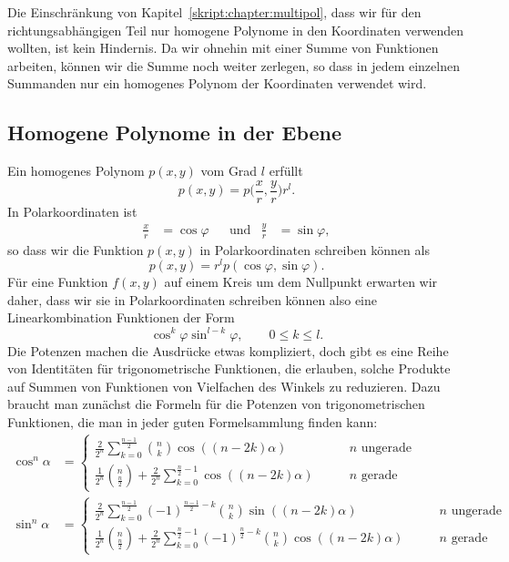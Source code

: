 
Die Einschränkung von Kapitel~\ref{skript:chapter:multipol}, dass wir
für den richtungsabhängigen Teil nur homogene Poly\-nome in den Koordinaten
verwenden wollten, ist kein Hindernis.
Da wir ohnehin mit einer Summe von Funktionen arbeiten, können wir
die Summe noch weiter zerlegen, so dass in jedem einzelnen Summanden nur ein
homogenes Polynom der Koordinaten verwendet wird.

\subsection{Homogene Polynome in der Ebene}
Ein homogenes Polynom $p(x,y)$ vom Grad $l$ erfüllt
\[
p(x,y) = p\biggl(\frac{x}{r},\frac{y}{r}\biggr) r^l.
\]
In Polarkoordinaten ist
\[
\begin{aligned}
\frac{x}{r}&=\cos\varphi
&&\text{und}&
\frac{y}{r}&=\sin\varphi,
\end{aligned}
\]
so dass wir die Funktion $p(x,y)$ in Polarkoordinaten schreiben
können als
\[
p(x,y)=r^l p(\cos\varphi,\sin\varphi).
\]
Für eine Funktion $f(x,y)$ auf einem Kreis um dem Nullpunkt erwarten wir
daher, dass wir sie in Polarkoordinaten schreiben können also eine
Linearkombination Funktionen der Form
\begin{equation}
\cos^k\varphi \sin^{l-k}\varphi,\qquad 0\le k\le l.
\label{skript:kugelfunktionen:produkte}
\end{equation}
Die Potenzen machen die Ausdrücke etwas kompliziert, doch gibt
es eine Reihe von Identitäten für trigonometrische Funktionen,
die erlauben, solche Produkte auf Summen von Funktionen von 
Vielfachen des Winkels zu reduzieren.
Dazu braucht man zunächst die Formeln für die Potenzen von trigonometrischen
Funktionen, die man in jeder guten Formelsammlung finden kann:
\begin{align*}
\cos^n\alpha
&=
\begin{cases}
\displaystyle
\frac{2}{2^n}\sum_{k=0}^{\frac{n-1}2} \binom{n}{k}\cos((n-2k)\alpha)
&\qquad\text{$n$ ungerade}
\\[10pt]
\displaystyle
\frac{1}{2^n}\binom{n}{\frac{n}2}
+
\frac{2}{2^n}\sum_{k=0}^{\frac{n}2-1}\cos((n-2k)\alpha)
&\qquad\text{$n$ gerade}
\end{cases}
\\
\sin^n\alpha
&=
\begin{cases}
\displaystyle
\frac{2}{2^n}\sum_{k=0}^{\frac{n-1}2} (-1)^{\frac{n-1}2-k}\binom{n}{k}\sin((n-2k)\alpha)
&\qquad\text{$n$ ungerade}
\\[10pt]
\displaystyle
\frac{1}{2^n}\binom{n}{\frac{n}2}
+
\frac{2}{2^n}\sum_{k=0}^{\frac{n}2-1}(-1)^{\frac{n}2-k}\binom{n}{k}\cos((n-2k)\alpha)
&\qquad\text{$n$ gerade}
\end{cases}
\end{align*}
